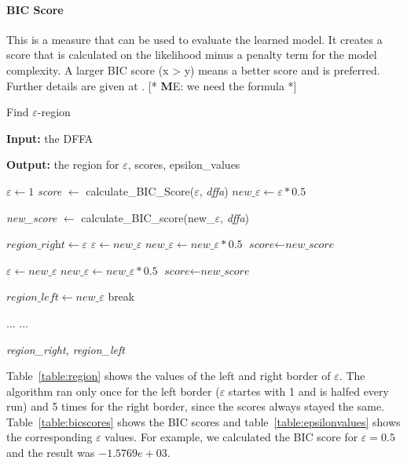 \documentclass[
a4paper,     %
12pt         %
]{scrartcl}  %
\newcommand\me[1]{ [* {\textbf ME:} #1 *]}
\begin{document}
\paragraph{BIC Score} This is a measure that can be used to evaluate the learned model. It creates a score that is calculated on the likelihood minus a penalty term for the model complexity. A larger BIC score (x > y) means a better score and is preferred. Further details are given at \cite{Mao.}.
\me{we need the formula}

\begin{algorithm}[H]
\caption{Find $\varepsilon$-region}\label{alg:findregion}
\begin{algorithmic}[1]
\item \textbf{Input:} the DFFA
\item \textbf{Output:} the region for $\varepsilon$, scores, epsilon\_values

\State $\varepsilon \gets \textit{1}$
\State \textit{score} $\gets$ calculate\_BIC\_Score($\varepsilon$, \textit{dffa})
\State $new\_\varepsilon \gets \varepsilon * 0.5$


       \State \textit{new\_score} $\gets$ calculate\_BIC\_score(new\_$\varepsilon$, \textit{dffa})

           \label{findregion:scorelarger}
         \State $\textit{region\_right} \gets \varepsilon$
         \State $\varepsilon \gets new\_\varepsilon$
         \State $ new\_\varepsilon \gets new\_\varepsilon * 0.5$
         \State $\textit{score} \gets \textit{new\_score} $

           \label{findregion:scorethesame}
   	 \State $\varepsilon \gets new\_\varepsilon$
         \State $ new\_\varepsilon \gets new\_\varepsilon * 0.5$
         \State $\textit{score} \gets \textit{new\_score} $

      \Else \label{findregion:scoresmaller}
      \State $\textit{region\_left} \gets new\_\varepsilon$
        \State break
       \EndIf

  \EndWhile

  \State ...
  \State ...

\State \Return \textit{region\_right, region\_left}
\end{algorithmic}
\end{algorithm}

Table~\ref{table:region} shows the values of the left and right border of $\varepsilon$. The algorithm ran only once for the left border ($\varepsilon$ startes with 1 and is halfed every run) and 5 times for the right border, since the scores always stayed the same. Table~\ref{table:bicscores} shows the BIC scores and table~\ref{table:epsilonvalues} shows the corresponding $\varepsilon$ values. For example, we calculated the BIC score for $\varepsilon = 0.5$ and the result was $-1.5769e+03$.
\end{document}
